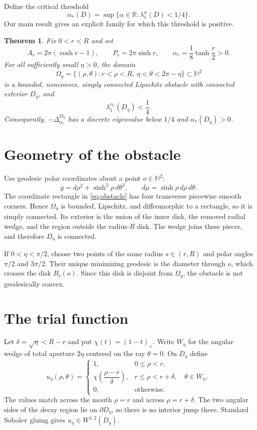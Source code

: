 \documentclass[11pt]{article}
\newtheorem{theorem}{Theorem}
\theoremstyle{remark}
\begin{document}
Define the critical threshold
\[
 \alpha_*(D)=\sup\{\alpha\in\mathbb R:\lambda_1^\alpha(D)<1/4\}.
\]
Our main result gives an explicit family for which this threshold is positive.

\begin{theorem}\label{thm:main}
Fix $0<r<R$ and set
\[
 A_r=2\pi(\cosh r-1),
 \qquad
 P_r=2\pi\sinh r,
 \qquad
 \alpha_r=\frac18\tanh\frac r2>0.
\]
For all sufficiently small $\eta>0$, the domain
\begin{equation}\label{eq:obstacle}
 \Omega_\eta
 =\{(\rho,\theta):r<\rho<R,\ \eta<\theta<2\pi-\eta\}
 \subset\mathbb H^2
\end{equation}
is a bounded, nonconvex, simply connected Lipschitz obstacle with connected
exterior $D_\eta$, and
\[
 \lambda_1^{\alpha_r}(D_\eta)<\frac14.
\]
Consequently, $-\Delta_{\alpha_r}^{D_\eta}$ has a discrete eigenvalue below
$1/4$ and $\alpha_*(D_\eta)>0$.
\end{theorem}

\section{Geometry of the obstacle}

Use geodesic polar coordinates about a point $o\in\mathbb H^2$:
\[
 g=d\rho^2+\sinh^2\rho\,d\theta^2,
 \qquad
 d\mu=\sinh\rho\,d\rho\,d\theta.
\]
The coordinate rectangle in \eqref{eq:obstacle} has four transverse
piecewise smooth corners.  Hence $\Omega_\eta$ is bounded, Lipschitz, and
diffeomorphic to a rectangle, so it is simply connected.  Its exterior is
the union of the inner disk, the removed radial wedge, and the region outside
the radius-$R$ disk.  The wedge joins these pieces, and therefore $D_\eta$
is connected.

If $0<\eta<\pi/2$, choose two points of the same radius
$s\in(r,R)$ and polar angles $\pi/2$ and $3\pi/2$.  Their unique minimizing
geodesic is the diameter through $o$, which crosses the disk $B_r(o)$.
Since this disk is disjoint from $\Omega_\eta$, the obstacle is not
geodesically convex.

\section{The trial function}

Let $\delta=\sqrt\eta<R-r$ and put $\chi(t)=(1-t)_+$.  Write $W_\eta$ for
the angular wedge of total aperture $2\eta$ centered on the ray $\theta=0$.
On $D_\eta$ define
\begin{equation}\label{eq:trial}
 u_\eta(\rho,\theta)=
 \begin{cases}
  1,&0\le\rho<r,\\[1mm]
  \chi\!\left(\dfrac{\rho-r}{\delta}\right),
  &r\le\rho<r+\delta,\quad\theta\in W_\eta,\\[3mm]
  0,&\text{otherwise}.
 \end{cases}
\end{equation}
The values match across the mouth $\rho=r$ and across
$\rho=r+\delta$.  The two angular sides of the decay region lie on
$\partial D_\eta$, so there is no interior jump there.  Standard Sobolev
gluing gives $u_\eta\in W^{1,2}(D_\eta)$.
\end{document}
